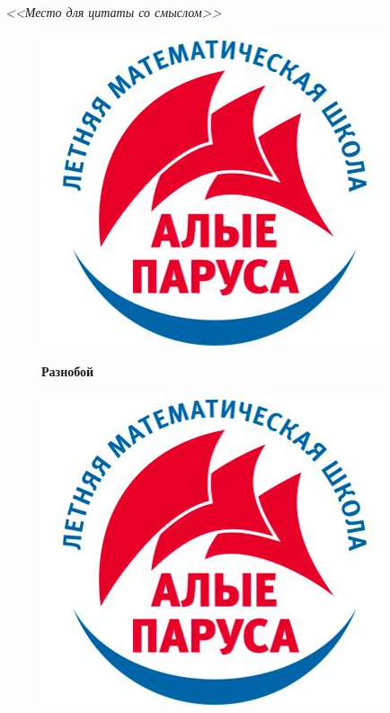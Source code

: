 \documentclass[12 pt, a4paper]{article}%
\begin{document}
	\newpage
	\begin{flushright}
		\textit{<<Место для цитаты со смыслом>>}
	\end{flushright}
	\begin{figure}[t]
	\begin{minipage}[h]{0.33\linewidth}
		\includegraphics[width=0.33\linewidth, left]{logo.jpg}
	\end{minipage}
	\begin{minipage}[h]{0.33\linewidth}
		\centering
		\large{\textbf{Разнобой}}\\
	\end{minipage}
	\begin{minipage}[h]{0.33\linewidth}
		\includegraphics[width=0.33\linewidth, right]{logo.jpg}
	\end{minipage}
	\label{ris:image1}
\end{figure}
	
\end{document}
